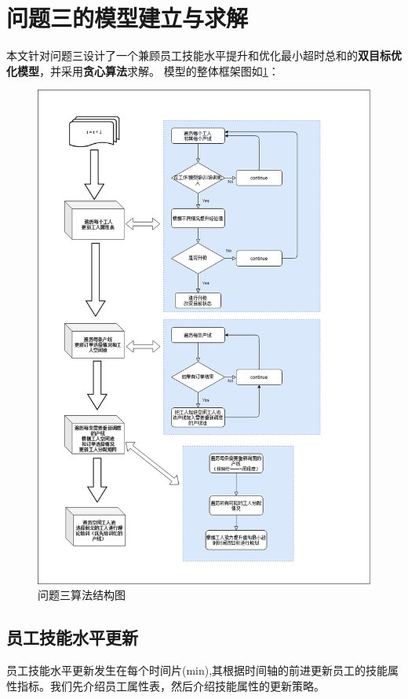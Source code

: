 \section{问题三的模型建立与求解}
本文针对问题三设计了一个兼顾员工技能水平提升和优化最小超时总和的\textbf{双目标优化模型}，并采用\textbf{贪心算法}求解。
模型的整体框架图如\cref{fig:stru}：

\begin{figure}[h]
    \centering
    \includegraphics[height = 0.65\textheight]{pics/p4.png}
    \caption{问题三算法结构图}
    \label{fig:stru}
\end{figure}
\newpage

\subsection{员工技能水平更新}
员工技能水平更新发生在每个时间片(min),其根据时间轴的前进更新员工的技能属性指标。我们先介绍员工属性表，然后介绍技能属性的更新策略。

